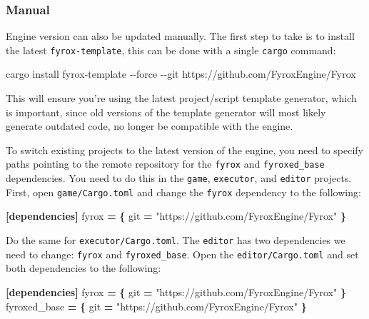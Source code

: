 \documentclass[
]{book}
\newenvironment{Shaded}{\begin{snugshade}}{\end{snugshade}}
\newcommand{\DataTypeTok}[1]{\textcolor[rgb]{0.13,0.29,0.53}{#1}}
\newcommand{\KeywordTok}[1]{\textcolor[rgb]{0.13,0.29,0.53}{\textbf{#1}}}
\newcommand{\NormalTok}[1]{#1}
\newcommand{\OperatorTok}[1]{\textcolor[rgb]{0.81,0.36,0.00}{\textbf{#1}}}
\newcommand{\StringTok}[1]{\textcolor[rgb]{0.31,0.60,0.02}{#1}}
\theoremstyle{definition}
\theoremstyle{definition}
\theoremstyle{definition}
\theoremstyle{definition}
\theoremstyle{remark}
\begin{document}
\subsubsection{Manual}\label{manual}

Engine version can also be updated manually. The first step to take is to install the latest \texttt{fyrox-template}, this can be done with a single \texttt{cargo} command:

\begin{Shaded}
\begin{Highlighting}[]
\NormalTok{cargo install fyrox{-}template {-}{-}force {-}{-}git https://github.com/FyroxEngine/Fyrox}
\end{Highlighting}
\end{Shaded}

This will ensure you're using the latest project/script template generator, which is important, since old versions of the template generator will most likely generate outdated code, no longer be compatible with the engine.

To switch existing projects to the latest version of the engine, you need to specify paths pointing to the remote repository for the \texttt{fyrox} and \texttt{fyroxed\_base} dependencies. You need to do this in the \texttt{game}, \texttt{executor}, and \texttt{editor} projects. First, open \texttt{game/Cargo.toml} and change the \texttt{fyrox} dependency to the following:

\begin{Shaded}
\begin{Highlighting}[]
\KeywordTok{[dependencies]}
\DataTypeTok{fyrox} \OperatorTok{=} \OperatorTok{\{ }\DataTypeTok{git}\OperatorTok{ =} \StringTok{"https://github.com/FyroxEngine/Fyrox"}\OperatorTok{ \}}
\end{Highlighting}
\end{Shaded}

Do the same for \texttt{executor/Cargo.toml}. The \texttt{editor} has two dependencies we need to change: \texttt{fyrox} and \texttt{fyroxed\_base}. Open the \texttt{editor/Cargo.toml} and set both dependencies to the following:

\begin{Shaded}
\begin{Highlighting}[]
\KeywordTok{[dependencies]}
\DataTypeTok{fyrox} \OperatorTok{=} \OperatorTok{\{ }\DataTypeTok{git}\OperatorTok{ =} \StringTok{"https://github.com/FyroxEngine/Fyrox"}\OperatorTok{ \}}
\DataTypeTok{fyroxed\_base} \OperatorTok{=} \OperatorTok{\{ }\DataTypeTok{git}\OperatorTok{ =} \StringTok{"https://github.com/FyroxEngine/Fyrox"}\OperatorTok{ \}}
\end{Highlighting}
\end{Shaded}
\end{document}
